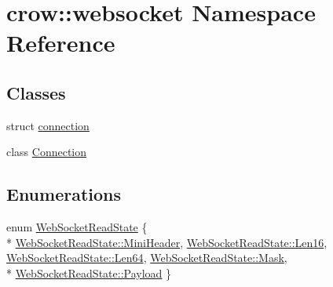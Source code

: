 \hypertarget{namespacecrow_1_1websocket}{\section{crow\-:\-:websocket Namespace Reference}
\label{namespacecrow_1_1websocket}
}
\subsection*{Classes}
\begin{DoxyCompactItemize}
\item 
struct \hyperlink{structcrow_1_1websocket_1_1connection}{connection}
\item 
class \hyperlink{classcrow_1_1websocket_1_1_connection}{Connection}
\end{DoxyCompactItemize}
\subsection*{Enumerations}
\begin{DoxyCompactItemize}
\item 
enum \hyperlink{namespacecrow_1_1websocket_a2d7a65cf1c63efe21238c6e75c02334c}{Web\-Socket\-Read\-State} \{ \\*
\hyperlink{namespacecrow_1_1websocket_a2d7a65cf1c63efe21238c6e75c02334cad637a34702e8bfb6adc600f1ae827f35}{Web\-Socket\-Read\-State\-::\-Mini\-Header}, 
\hyperlink{namespacecrow_1_1websocket_a2d7a65cf1c63efe21238c6e75c02334ca6a687f78479d558a907bbaac0d7f53f0}{Web\-Socket\-Read\-State\-::\-Len16}, 
\hyperlink{namespacecrow_1_1websocket_a2d7a65cf1c63efe21238c6e75c02334cab70bcc4d8160e709624eaa6377a35c5d}{Web\-Socket\-Read\-State\-::\-Len64}, 
\hyperlink{namespacecrow_1_1websocket_a2d7a65cf1c63efe21238c6e75c02334ca4a18312b5b75f549d5551e5912ad6ebf}{Web\-Socket\-Read\-State\-::\-Mask}, 
\\*
\hyperlink{namespacecrow_1_1websocket_a2d7a65cf1c63efe21238c6e75c02334ca00f4e5788aab6d3546bb433842dbbefc}{Web\-Socket\-Read\-State\-::\-Payload}
 \}
\end{DoxyCompactItemize}


